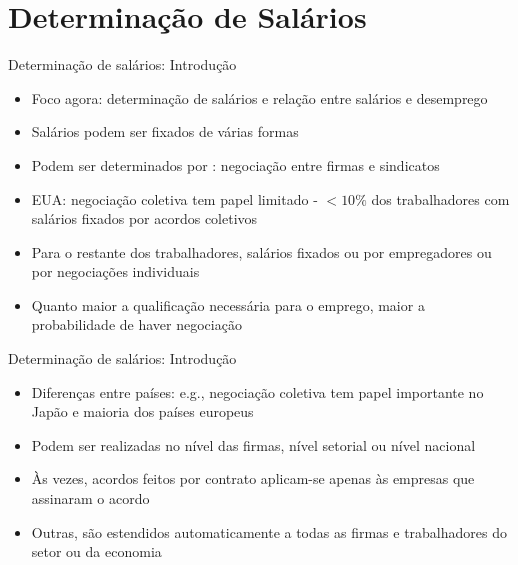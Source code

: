 \documentclass[10pt]{beamer}
\begin{document}
\section{Determinação de Salários}
\begin{frame}
    {Determinação de salários: Introdução}
    \begin{itemize}
        \item Foco agora: determinação de salários e relação entre salários e desemprego\bigskip
        \item Salários podem ser fixados de várias formas\bigskip
        \item Podem ser determinados por : negociação entre firmas e sindicatos\bigskip
        \item EUA: negociação coletiva tem papel limitado - $< 10\%$ dos trabalhadores com salários fixados por acordos coletivos\bigskip
        \item Para o restante dos trabalhadores, salários fixados ou por empregadores ou por negociações individuais\bigskip
        \item Quanto maior a qualificação necessária para o emprego, maior a probabilidade de haver negociação
    \end{itemize}
\end{frame}

\begin{frame}
    {Determinação de salários: Introdução}
    \begin{itemize}
        \item Diferenças entre países: e.g., negociação coletiva tem papel importante no Japão e maioria dos países europeus\bigskip
        \item Podem ser realizadas no nível das firmas, nível setorial ou nível nacional\bigskip
        \item Às vezes, acordos feitos por contrato aplicam-se apenas às empresas que assinaram o acordo\bigskip
        \item Outras, são estendidos automaticamente a todas as firmas e trabalhadores do setor ou da economia
    \end{itemize}
\end{frame}
\end{document}
